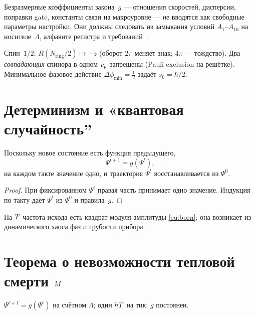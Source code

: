 \begin{axiom}
\label{ax:A15}
Безразмерные коэффициенты закона~$g$ --- отношения скоростей, дисперсии, поправки gate,
константы связи на макроуровне --- \emph{не} вводятся как свободные параметры настройки.
Они должны следовать из замыкания условий $A_1$--$A_{16}$ на носителе~$\Lambda$,
алфавите регистра и требований~.
\end{axiom}

\begin{axiom}
\label{ax:A16}
Спин~$1/2$: $R(N_{\mathrm{ring}}/2)\mapsto -z$ (оборот $2\pi$ меняет знак; $4\pi$ --- тождство).
Два \emph{совпадающих} спинора в одном $v_p$ запрещены (Pauli exclusion на решётке).
Минимальное фазовое действие $\Delta\phi_{\min}=\tfrac12$ задаёт $s_0=\hbar/2$.
\end{axiom}

\section{Детерминизм и «квантовая случайность''}

\begin{proposition}
\label{prop:determinism}
Поскольку новое состояние есть функция предыдущего,
\[
  \Psi^{t+1}=g(\Psi^t),
\]
на каждом такте значение одно, и траектория $\Psi^t$ восстанавливается из $\Psi^0$.
\end{proposition}

\begin{proof}
При фиксированном $\Psi^t$ правая часть принимает одно значение.
Индукция по такту даёт $\Psi^t$ из $\Psi^0$ и правила~$g$.
\end{proof}

На $T$ частота исхода есть квадрат модуля амплитуды \eqref{eq:born};
она возникает из динамического хаоса фаз и грубости прибора.

\section{Теорема о невозможности тепловой смерти \texorpdfstring{$M$}{M}}
\label{sec:theorem-23}

\begin{definition}[M-эволюция]
\label{def:state-evolution}
$\Psi^{t+1}=g(\Psi^t)$ на счётном $\Lambda$; один $hT$ на тик; $g$ постоянен.
\end{definition}

